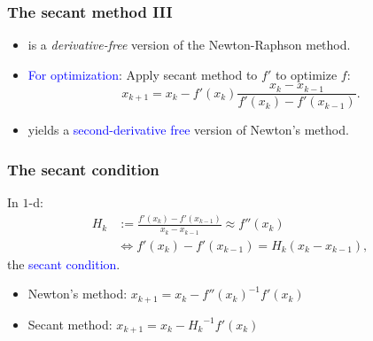 \documentclass{beamer}
\begin{document}
\begin{frame}
  \frametitle{The secant method III}
  \begin{itemize}
    \item is a \emph{derivative-free} version of the Newton-Raphson method.
    \item \textcolor{blue}{For optimization}: Apply secant method to $f'$ to optimize $f$:
          \begin{equation}
            x_{k+1} = x_k - f'(x_k) \frac{x_k - x_{k-1}}{f'(x_k) - f'(x_{k-1})}.
          \end{equation}
    \item yields a \textcolor{blue}{second-derivative free} version of Newton's method.
  \end{itemize}

  \vspace{1cm}

\end{frame}


\begin{frame}
  \frametitle{The secant condition}
  In $1$-d:
  \begin{align}
    H_k &:= \frac{f'(x_k) - f'(x_{k-1})}{x_k - x_{k-1}} \approx f''(x_k) \\
    &\Leftrightarrow f'(x_k) - f'(x_{k-1}) = H_k (x_k - x_{k-1}),
  \end{align}
  the \textcolor{blue}{secant condition}.
  \begin{itemize}
    \item Newton's method: $x_{k+1} = x_k - {f''(x_k)}^{-1} f'(x_k)$
    \item Secant method: $x_{k+1} = x_k - {H_k}^{-1} f'(x_k)$
  \end{itemize}
\end{frame}
\end{document}
